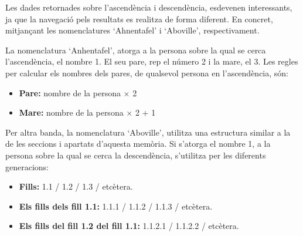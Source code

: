 Les dades retornades sobre l'ascendència i descendència, esdevenen interessants, ja que la navegació pels resultats es realitza de forma diferent. En concret, mitjançant les nomenclatures `Ahnentafel' i `Aboville', respectivament.

La nomenclatura `Anhentafel', atorga a la persona sobre la qual se cerca l'as\-cen\-dèn\-cia, el nombre 1. El seu pare, rep el número 2 i la mare, el 3. Les regles per calcular els nombres dels pares, de qualsevol persona en l'ascendència, són:

\begin{itemize}
    \item \textbf{Pare:} nombre de la persona $\times$ 2
    \item \textbf{Mare:} nombre de la persona $\times$ 2 + 1
\end{itemize}

Per altra banda, la nomenclatura `Aboville', utilitza una estructura similar a la de les seccions i apartats d'aquesta memòria. Si s'atorga el nombre 1, a la persona sobre la qual se cerca la descendència, s'utilitza per les diferents generacions:

\begin{itemize}
    \item \textbf{Fills:} 1.1 / 1.2 / 1.3 / etcètera.
    \item \textbf{Els fills dels fill 1.1:} 1.1.1 / 1.1.2 / 1.1.3 / etcètera.
    \item \textbf{Els fills del fill 1.2 del fill 1.1:} 1.1.2.1 / 1.1.2.2 / etcètera.
\end{itemize}
